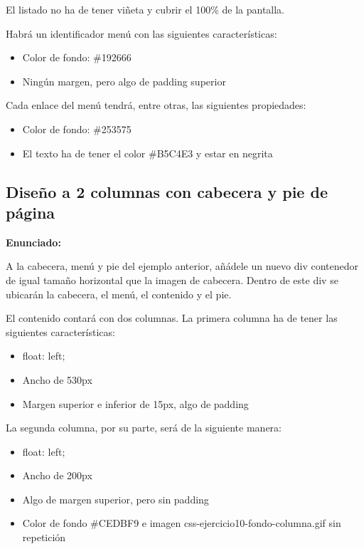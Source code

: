 El listado no ha de tener viñeta y cubrir el 100\% de la pantalla.

Habrá un identificador menú con las siguientes características:

\begin{itemize}
  \item Color de fondo: \#192666
  \item Ningún margen, pero algo de padding superior
\end{itemize}

Cada enlace del menú tendrá, entre otras, las siguientes propiedades:

\begin{itemize}
  \item Color de fondo: \#253575
  \item El texto ha de tener el color \#B5C4E3 y estar en negrita
\end{itemize}

\subsection{Diseño a 2 columnas con cabecera y pie de página}
\label{subsec:2columnas}

\textbf{Enunciado:}

A la cabecera, menú y pie del ejemplo anterior, añádele un nuevo div contenedor de igual tamaño horizontal que la imagen de cabecera. Dentro de este div se ubicarán la cabecera, el menú, el contenido y el pie.

El contenido contará con dos columnas. La primera columna ha de tener las siguientes características:

\begin{itemize}
  \item float: left;
  \item Ancho de 530px
  \item Margen superior e inferior de 15px, algo de padding
\end{itemize}

La segunda columna, por su parte, será de la siguiente manera:

\begin{itemize}
  \item float: left;
  \item Ancho de 200px
  \item Algo de margen superior, pero sin padding
  \item Color de fondo \#CEDBF9 e imagen css-ejercicio10-fondo-columna.gif sin repetición
\end{itemize}

